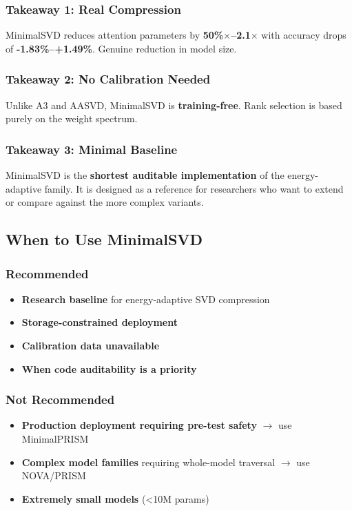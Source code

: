 \subsubsection{Takeaway 1: Real Compression}

MinimalSVD reduces attention parameters by \textbf{50\%$\times$--2.1$\times$} with 
accuracy drops of \textbf{-1.83\%--+1.49\%}. Genuine reduction in model 
size.

\subsubsection{Takeaway 2: No Calibration Needed}

Unlike A3 and AASVD, MinimalSVD is \textbf{training-free}. Rank selection is based 
purely on the weight spectrum.

\subsubsection{Takeaway 3: Minimal Baseline}

MinimalSVD is the \textbf{shortest auditable implementation} of the energy-adaptive 
family. It is designed as a reference for researchers who want to extend or 
compare against the more complex variants.

\subsection{When to Use MinimalSVD}

\subsubsection{Recommended}

\begin{itemize}
\item \textbf{Research baseline} for energy-adaptive SVD compression
\item \textbf{Storage-constrained deployment}
\item \textbf{Calibration data unavailable}
\item \textbf{When code auditability is a priority}

\end{itemize}
\subsubsection{Not Recommended}

\begin{itemize}
\item \textbf{Production deployment requiring pre-test safety} $\to$ use MinimalPRISM
\item \textbf{Complex model families} requiring whole-model traversal $\to$ use NOVA/PRISM
\item \textbf{Extremely small models} (<10M params)

\end{itemize}
